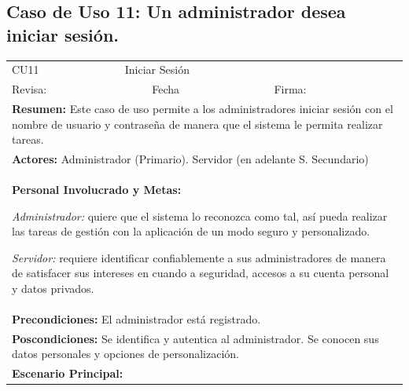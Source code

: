 		\subsection{Caso de Uso 11: Un administrador desea iniciar sesión.}
			\begin{longtable}{|l|p{5.5cm}|l|p{2cm}|l|p{1.9cm}|} \hline
					\cellcolor{grisOscuro} CU11 & \multicolumn{4}{|l|}{  \cellcolor{grisOscuro} Iniciar Sesión} &  \cellcolor{grisClaro}\multirow{2}{1cm}{} \\ \cline{1-5}
					\cellcolor{grisOscuro} Revisa: &  \cellcolor{grisClaro} &  \cellcolor{grisOscuro} Fecha &  \cellcolor{grisClaro} &  \cellcolor{grisOscuro} Firma: & \cellcolor{grisClaro} \\ \hline
					\multicolumn{6}{|p{15cm}|}{ \textbf{Resumen: } Este caso de uso permite a los administradores iniciar sesión con el nombre de usuario y contraseña de manera que el sistema le permita realizar tareas.

					} \\ \hline

					\multicolumn{6}{|p{15cm}|}{ \textbf{Actores: } Administrador (Primario). Servidor (en adelante S. Secundario)

					} \\ \hline

					\multicolumn{6}{|p{15cm}|}{ \textbf{Personal Involucrado y Metas: }

					\emph{Administrador:} quiere que el sistema lo reconozca como tal, así pueda realizar las tareas de gestión con la aplicación de un modo seguro y personalizado.

					\emph{Servidor:} requiere identificar confiablemente a sus administradores de manera de satisfacer sus intereses en cuando a seguridad, accesos a su cuenta personal y datos privados.

					} \\ \hline

					\multicolumn{6}{|p{15cm}|}{ \textbf{Precondiciones: } El administrador está registrado.

					} \\ \hline

					\multicolumn{6}{|p{15cm}|}{ \textbf{Poscondiciones: } Se identifica y autentica al administrador. Se conocen sus datos personales y opciones de personalización.

					} \\ \hline

					\multicolumn{6}{|p{15cm}|}{ \textbf{Escenario Principal: }

}
\end{longtable}
